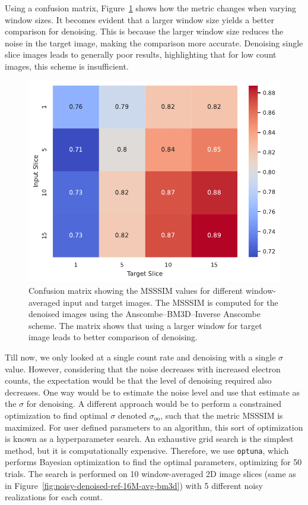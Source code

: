 Using a confusion matrix, Figure~\ref{fig:confusion_matrix_msssim_window_avg} shows how the metric changes when varying window sizes. It becomes evident that a larger window size yields a better comparison for denoising. This is because the larger window size reduces the noise in the target image, making the comparison more accurate. Denoising single slice images leads to generally poor results, highlighting that for low count images, this scheme is insufficient.

\begin{figure}[h]
    \centering
    \includegraphics[width=0.5\linewidth]{images/confusion_matrix_msssim_window_avg.pdf}
    \caption{Confusion matrix showing the \gls{MSSSIM} values for different window-averaged input and target images. The \gls{MSSSIM} is computed for the denoised images using the Anscombe--\gls{BM3D}--Inverse Anscombe scheme. The matrix shows that using a larger window for target image leads to better comparison of denoising.}
    \label{fig:confusion_matrix_msssim_window_avg}
\end{figure}

Till now, we only looked at a single count rate and denoising with a single $\sigma$ value. However, considering that the noise decreases with increased electron counts, the expectation would be that the level of denoising required also decreases. One way would be to estimate the noise level and use that estimate as the $\sigma$ for denoising. A different approach would be to perform a constrained optimization to find optimal $\sigma$ denoted $\sigma_{\text{oo}}$, such that the metric \gls{MSSSIM} is maximized. For user defined parameters to an algorithm, this sort of optimization is known as a hyperparameter search. An exhaustive grid search is the simplest method, but it is computationally expensive. Therefore, we use \texttt{optuna}, which performs Bayesian optimization to find the optimal parameters, optimizing for \num{50} trials. The search is performed on \num{10} window-averaged 2D image slices (same as in Figure~\ref{fig:noisy-denoised-ref-16M-avg-bm3d}) with 5 different noisy realizations for each count.


